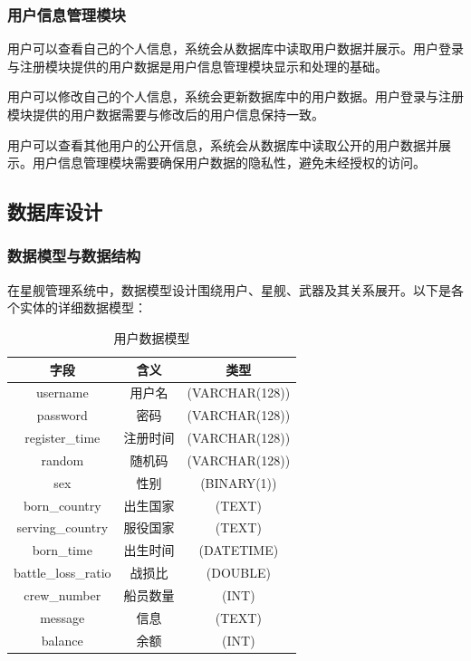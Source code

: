 \documentclass{base}
\begin{document}
\subsubsection{用户信息管理模块}

用户可以查看自己的个人信息，系统会从数据库中读取用户数据并展示。用户登录与注册模块提供的用户数据是用户信息管理模块显示和处理的基础。

用户可以修改自己的个人信息，系统会更新数据库中的用户数据。用户登录与注册模块提供的用户数据需要与修改后的用户信息保持一致。

用户可以查看其他用户的公开信息，系统会从数据库中读取公开的用户数据并展示。用户信息管理模块需要确保用户数据的隐私性，避免未经授权的访问。


\subsection{数据库设计}

\subsubsection{数据模型与数据结构}
在星舰管理系统中，数据模型设计围绕用户、星舰、武器及其关系展开。以下是各个实体的详细数据模型：
\begin{table}[H]
	\centering
	\caption{用户数据模型}
	\begin{tabular}{@{}ccc@{}}
		\toprule
		字段                  & 含义   & 类型             \\ \midrule
		username            & 用户名  & (VARCHAR(128)) \\
		password            & 密码   & (VARCHAR(128)) \\
		register\_time      & 注册时间 & (VARCHAR(128)) \\
		random              & 随机码  & (VARCHAR(128)) \\
		sex                 & 性别   & (BINARY(1))    \\
		born\_country       & 出生国家 & (TEXT)         \\
		serving\_country    & 服役国家 & (TEXT)         \\
		born\_time          & 出生时间 & (DATETIME)     \\
		battle\_loss\_ratio & 战损比  & (DOUBLE)       \\
		crew\_number        & 船员数量 & (INT)          \\
		message             & 信息   & (TEXT)         \\
		balance             & 余额   & (INT)          \\ \bottomrule
	\end{tabular}
\end{table}
\end{document}
